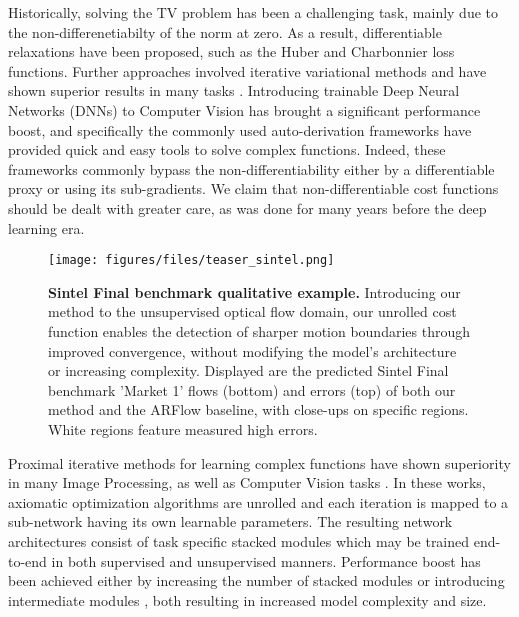 \documentclass[10pt,twocolumn,letterpaper]{article}
\begin{document}
Historically, solving the TV problem has been a challenging task, mainly due to the non-differenetiabilty of the  norm at zero. 
As a result, differentiable relaxations have been proposed, such as the Huber \cite{huber1964robust} and Charbonnier \cite{charbonnier1997deterministic} loss functions. Further approaches involved iterative variational methods and have shown superior results in many tasks \cite{admm0,zach2007duality,RUDIN1992259}.
Introducing trainable Deep Neural Networks (DNNs) to Computer Vision has brought a significant performance boost, and specifically the commonly used auto-derivation frameworks \cite{pytorch,jia2014caffe,tensorflow2015-whitepaper} have provided quick and easy tools to solve complex functions. Indeed, these frameworks commonly bypass the  non-differentiability either by a differentiable proxy or using its sub-gradients. We claim that non-differentiable cost functions should be dealt with greater care, as was done for many years before the deep learning era.

\begin{figure}
\begin{center}
\texttt{[image: figures/files/teaser\_sintel.png]}
\end{center}
   \caption{\textbf{Sintel Final benchmark qualitative example.}
Introducing our method to the unsupervised optical flow domain, our unrolled cost function enables the detection of sharper motion boundaries through improved convergence, without modifying the model's architecture or increasing complexity.
Displayed are the predicted Sintel Final benchmark 'Market 1' flows (bottom) and errors (top) of both our method and the ARFlow \cite{liu2020learning} baseline, with close-ups on specific regions.
   White regions feature measured high errors.
   }
\label{fig:teaser}
\end{figure}
 
Proximal iterative methods for learning complex functions have shown superiority in many Image Processing, as well as Computer Vision tasks \cite{wang2016proximal,monga2019algorithm,zhang2020deep}. In these works, axiomatic optimization algorithms are unrolled and each iteration is mapped to a sub-network having its own learnable parameters. The resulting network architectures consist of task specific stacked modules which may be trained end-to-end in both supervised and unsupervised manners. Performance boost has been achieved either by increasing the number of stacked modules \cite{wang2016proximal} or introducing intermediate modules  \cite{luo2021upflow,wang2020cot}, both resulting in increased model complexity and size.
\end{document}
